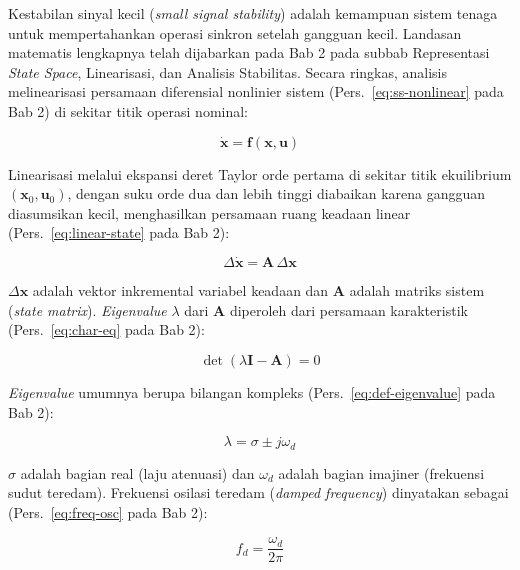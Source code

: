 Kestabilan sinyal kecil (\textit{small signal stability}) adalah kemampuan
sistem tenaga untuk mempertahankan operasi sinkron setelah gangguan kecil.
Landasan matematis lengkapnya telah dijabarkan pada Bab 2 pada subbab
Representasi \textit{State Space}, Linearisasi, dan Analisis Stabilitas.
Secara ringkas, analisis melinearisasi persamaan diferensial nonlinier sistem
(Pers.~\ref{eq:ss-nonlinear} pada Bab 2) di sekitar titik operasi nominal:

\begin{equation}
    \dot{\mathbf{x}} = \mathbf{f}(\mathbf{x}, \mathbf{u})
    \label{eq:nonlinear}
\end{equation}

Linearisasi melalui ekspansi deret Taylor orde pertama di sekitar titik
ekuilibrium $(\mathbf{x}_0, \mathbf{u}_0)$, dengan suku orde dua dan lebih
tinggi diabaikan karena gangguan diasumsikan kecil, menghasilkan persamaan
ruang keadaan linear (Pers.~\ref{eq:linear-state} pada Bab 2):

\begin{equation}
    \Delta\dot{\mathbf{x}} = \mathbf{A}\,\Delta\mathbf{x}
    \label{eq:state_space}
\end{equation}

\noindent $\Delta\mathbf{x}$ adalah vektor inkremental variabel keadaan dan
$\mathbf{A}$ adalah matriks sistem (\textit{state matrix}). \textit{Eigenvalue}
$\lambda$ dari $\mathbf{A}$ diperoleh dari persamaan karakteristik
(Pers.~\ref{eq:char-eq} pada Bab 2):

\begin{equation}
    \det(\lambda \mathbf{I} - \mathbf{A}) = 0
    \label{eq:char_eq}
\end{equation}

\textit{Eigenvalue} umumnya berupa bilangan kompleks
(Pers.~\ref{eq:def-eigenvalue} pada Bab 2):

\begin{equation}
    \lambda = \sigma \pm j\omega_d
    \label{eq:eigenvalue}
\end{equation}

\noindent $\sigma$ adalah bagian real (laju atenuasi) dan $\omega_d$ adalah
bagian imajiner (frekuensi sudut teredam). Frekuensi osilasi teredam
(\textit{damped frequency}) dinyatakan sebagai (Pers.~\ref{eq:freq-osc} pada
Bab 2):

\begin{equation}
    f_d = \frac{\omega_d}{2\pi}
    \label{eq:damped_freq}
\end{equation}

